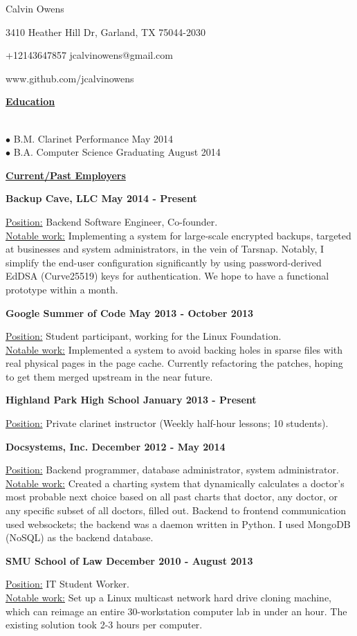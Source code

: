 \documentclass[11pt]{article}
\begin{document}
\centerline{{\Huge \sc Calvin Owens}}
\centerline{3410 Heather Hill Dr, Garland, TX 75044-2030}
\centerline{+12143647857 \textbullet \hspace{1pt} jcalvinowens@gmail.com}
\centerline{www.github.com/jcalvinowens}

\noindent
\hrulefill

\centerline{\underline{\bf Education}}
\bigskip
{} \\
\indent \indent $\bullet$ B.M. Clarinet Performance \hfill May 2014\\
\indent \indent $\bullet$ B.A. Computer Science \hfill Graduating August 2014

\noindent
\hrulefill

\centerline{\underline{\bf Current/Past Employers}}
\bigskip
\noindent\centerline{\bf Backup Cave, LLC \hfill May 2014 - Present}
\underline{Position:} Backend Software Engineer, Co-founder. \\
\underline{Notable work:} Implementing a system for large-scale encrypted
backups, targeted at businesses and system administrators, in the vein of
Tarsnap. Notably, I simplify the end-user configuration significantly by using
password-derived EdDSA (Curve25519) keys for authentication. We hope to have a
functional prototype within a month. 
\vspace*{6pt}\\
\noindent\centerline{\bf Google Summer of Code \hfill May 2013 - October 2013}
\underline{Position:} Student participant, working for the Linux Foundation. \\
\underline{Notable work:} Implemented a system to avoid backing holes in sparse
files with real physical pages in the page cache. Currently refactoring the
patches, hoping to get them merged upstream in the near future.
\vspace*{6pt}\\
\noindent\centerline{\bf Highland Park High School \hfill January 2013 - Present}
\underline{Position:} Private clarinet instructor (Weekly half-hour lessons; 10 students).
\vspace*{6pt}\\
\noindent\centerline{\bf Docsystems, Inc. \hfill December 2012 - May 2014}
\underline{Position:} Backend programmer, database administrator, system administrator. \\
\underline{Notable work:} Created a charting system that dynamically calculates
a doctor's most probable next choice based on all past charts that doctor, any
doctor, or any specific subset of all doctors, filled out. Backend to frontend
communication used websockets; the backend was a daemon written in Python. I
used MongoDB (NoSQL) as the backend database.
\vspace*{6pt}\\
\noindent\centerline{\bf SMU School of Law \hfill December 2010 - August 2013}
\underline{Position:} IT Student Worker. \\
\underline{Notable work:} Set up a Linux multicast network hard drive cloning
machine, which can reimage an entire 30-workstation computer lab in under an
hour. The existing solution took 2-3 hours per computer.
\end{document}
